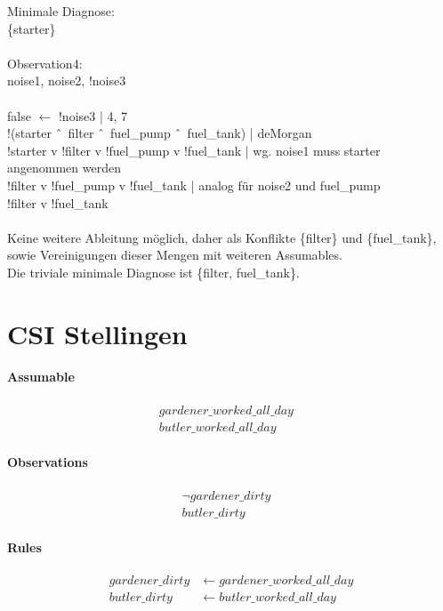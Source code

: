 \documentclass[DIV=9,numbers=noenddot]{scrartcl}
\begin{document}
	Minimale Diagnose:\\
	\{starter\}\\\\
	Observation4:\\
	noise1, noise2, !noise3\\\\
	false $\leftarrow$ !noise3	| 4, 7\\
	!(starter \^\ \ filter \^\ \ fuel\_pump \^\ \ fuel\_tank) | deMorgan\\
	!starter v !filter v !fuel\_pump v !fuel\_tank | wg. noise1 muss starter angenommen werden\\
	!filter v !fuel\_pump v !fuel\_tank | analog für noise2 und fuel\_pump\\
	!filter v !fuel\_tank\\\\
	Keine weitere Ableitung möglich, daher als Konflikte \{filter\} und \{fuel\_tank\}, sowie Vereinigungen dieser Mengen mit weiteren Assumables.\\
	Die triviale minimale Diagnose ist \{filter, fuel\_tank\}.
		
	\newpage
	\section{CSI Stellingen}
	\paragraph{Assumable}
	\begin{align*}
		  gardener\_worked\_all\_day&
		\\butler\_worked\_all\_day&
	\end{align*}
	
	\paragraph{Observations}
	\begin{align*}
		  \neg gardener\_dirty&
		\\butler\_dirty&
	\end{align*}
	
	\paragraph{Rules}
	\begin{align*}
		  gardener\_dirty &\leftarrow gardener\_worked\_all\_day
		\\butler\_dirty &\leftarrow butler\_worked\_all\_day
	\end{align*}
	
\end{document}
